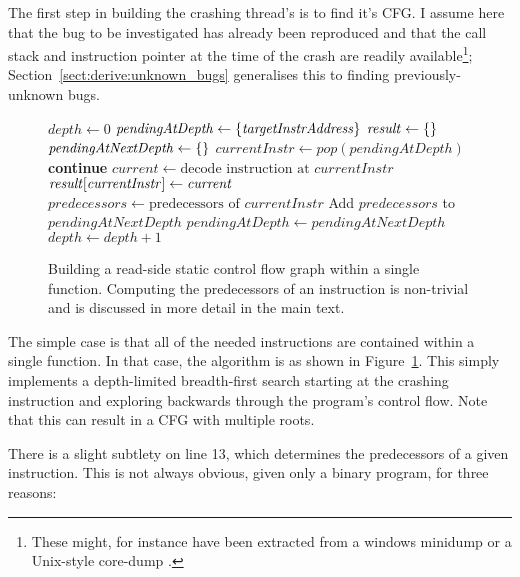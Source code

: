 The first step in building the crashing thread's {\StateMachine} is to
find it's CFG.  I assume here that the bug to be investigated has
already been reproduced and that the call stack and instruction
pointer at the time of the crash are readily available\footnote{These
  might, for instance have been extracted from a windows minidump
   or a Unix-style core-dump .};
Section~\ref{sect:derive:unknown_bugs} generalises this to finding
previously-unknown bugs.

\begin{figure}
\begin{algorithmic}[1]
\State $\mathit{depth} \gets 0$
\State $\mathit{pendingAtDepth} \gets \{\mathit{targetInstrAddress}\}$
\State $\mathit{result} \gets \{\}$
  \State $\mathit{pendingAtNextDepth} \gets \{\}$
    \State $\mathit{currentInstr} \gets \mathit{pop}(\mathit{pendingAtDepth})$
      \State \textbf{continue}
    \EndIf
    \State $\mathit{current} \gets \text{decode instruction at } \mathit{currentInstr}$
    \State $\mathit{result}[\mathit{currentInstr}] \gets \mathit{current}$
    \State $\mathit{predecessors} \gets \text{predecessors of } \mathit{currentInstr}$
    \State Add $\mathit{predecessors}$ to $\mathit{pendingAtNextDepth}$
  \EndWhile
  \State $\mathit{pendingAtDepth} \gets \mathit{pendingAtNextDepth}$
  \State $\mathit{depth} \gets \mathit{depth} + 1$
\EndWhile
\end{algorithmic}
\caption{Building a read-side static control flow graph within a
  single function.  Computing the predecessors of an instruction is
  non-trivial and is discussed in more detail in the main text.}
\label{fig:derive:static_read_cfg_single_function}
\end{figure}

The simple case is that all of the needed instructions are contained
within a single function.  In that case, the algorithm is as shown in
Figure~\ref{fig:derive:static_read_cfg_single_function}.  This simply
implements a depth-limited breadth-first search starting at the
crashing instruction and exploring backwards through the program's
control flow.  Note that this can result in a CFG with multiple roots.

There is a slight subtlety on line 13, which determines the
predecessors of a given instruction.  This is not always obvious,
given only a binary program, for three reasons:

